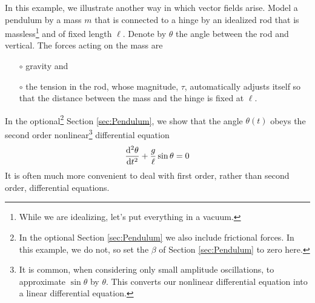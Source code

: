 \begin{eg}\label{eg:Pendulum}
In this example, we illustrate another way in which  vector fields
arise. Model a pendulum by a mass $m$ that is connected to a hinge by 
an idealized rod that is massless\footnote{While we are idealizing, let's put
everything in a vacuum.} and of fixed length $\ell$. Denote 
by $\theta$ the angle
between the rod and vertical. The forces acting on the mass are
\begin{itemize}\itemsep1pt \parskip0pt  %
\item[$\circ$]
gravity and
\item[$\circ$]
the tension in the rod, whose magnitude, $\tau$, automatically adjusts 
itself so that the distance between the mass and the hinge is 
fixed at $\ell$. 
\end{itemize}
In the optional\footnote{In the optional Section \ref{sec:Pendulum} we also
include frictional forces. In this example, we do not, so set the $\beta$
of Section \ref{sec:Pendulum} to zero here.} Section \ref{sec:Pendulum}, 
we show that the angle $\theta(t)$ obeys the second order 
nonlinear\footnote{It is common, when considering only small amplitude 
oscillations, to approximate $\sin\theta$ by $\theta$. This converts our
nonlinear differential equation into a linear differential equation.} 
differential equation
\begin{equation*}
\difftwo{\theta}{t} +\frac{g}{\ell}\sin\theta=0
\end{equation*}
It is often much more convenient to deal with first order, rather than
second order, differential equations.

\end{eg}
